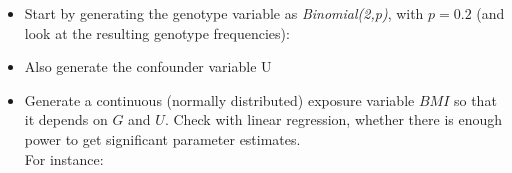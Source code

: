 \documentclass[
]{book}
\newenvironment{Shaded}{\begin{snugshade}}{\end{snugshade}}
\newcommand{\AttributeTok}[1]{\textcolor[rgb]{0.13,0.29,0.53}{#1}}
\newcommand{\DecValTok}[1]{\textcolor[rgb]{0.00,0.00,0.81}{#1}}
\newcommand{\FloatTok}[1]{\textcolor[rgb]{0.00,0.00,0.81}{#1}}
\newcommand{\FunctionTok}[1]{\textcolor[rgb]{0.13,0.29,0.53}{\textbf{#1}}}
\newcommand{\NormalTok}[1]{#1}
\newcommand{\OtherTok}[1]{\textcolor[rgb]{0.56,0.35,0.01}{#1}}
\newcommand{\SpecialCharTok}[1]{\textcolor[rgb]{0.81,0.36,0.00}{\textbf{#1}}}
\providecommand{\tightlist}{%
  \setlength{\itemsep}{0pt}\setlength{\parskip}{0pt}}
\begin{document}
\begin{itemize}
\tightlist
\item
  Start by generating the genotype variable as \emph{Binomial(2,p)}, with \(p=0.2\) (and look at the resulting genotype frequencies):
\end{itemize}

\begin{Shaded}
\end{Shaded}

\begin{itemize}
\tightlist
\item
  Also generate the confounder variable U
\end{itemize}

\begin{Shaded}
\end{Shaded}

\begin{itemize}
\tightlist
\item
  Generate a continuous (normally distributed) exposure variable \(BMI\) so that it depends on \(G\) and \(U\).
  Check with linear regression, whether there is enough power to get significant parameter estimates.\\
  For instance:
\end{itemize}

\begin{Shaded}
\end{Shaded}
\end{document}

